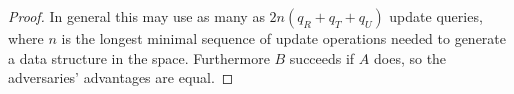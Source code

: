 {\begin{proof}
In general this may use as many as $2n(q_R+q_T+q_U)$ update queries, where $n$
is the longest minimal sequence of update operations needed to generate a data
structure in the space. Furthermore $B$ succeeds if $A$ does, so the
adversaries' advantages are equal.
%
\missingqed
\end{proof}
}